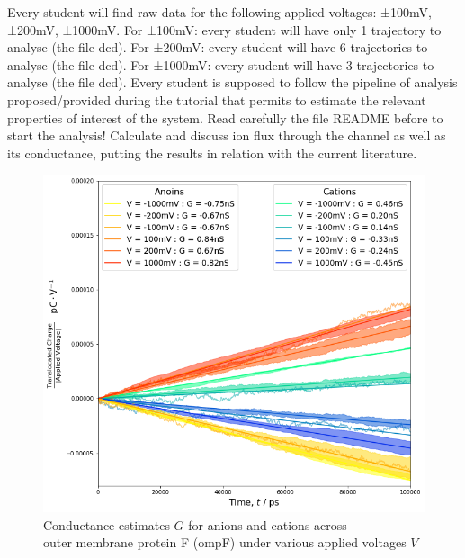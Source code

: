 \documentclass{article}[12pt]
\numberwithin{equation}{section}
\begin{document}
Every student will find raw data for the following applied voltages: ±100mV,
±200mV, ±1000mV.
For ±100mV: every student will have only 1 trajectory to analyse (the file dcd).
For ±200mV: every student will have 6 trajectories to analyse (the file dcd).
For ±1000mV: every student will have 3 trajectories to analyse (the file dcd).
Every student is supposed to follow the pipeline of analysis
proposed/provided during the tutorial that permits to estimate the relevant
properties of interest of the system. Read carefully the file README before to
start the analysis!
Calculate and discuss ion flux through the channel as well as its conductance,
putting the results in relation with the current literature.
\begin{figure}[H]
	\centering{}
	\captionsetup{justification=centering}
	\includegraphics[scale=0.5]{conductance}
\caption{Conductance estimates $G$ for anions and cations across\\ outer membrane
protein F (ompF) under various applied voltages $V$ }
\label{fig:conductance}
\end{figure}
\end{document}
